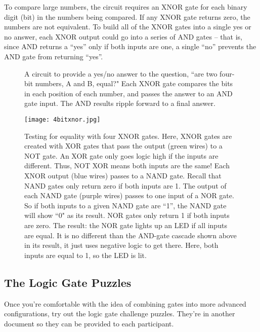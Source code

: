 To compare large numbers, the circuit requires an XNOR gate for each binary digit (bit) in the numbers being compared. If any XNOR gate returns zero, the numbers are not equivalent. To build all of the XNOR gates into a single yes or no answer, each XNOR output could go into a series of AND gates -- that is, since AND returns a ``yes'' only if both inputs are one, a single ``no'' prevents the AND gate from returning ``yes''. 


\begin{figure}[h!]
\begin{center}

\caption{A circuit to provide a yes/no answer to the question, ``are  two four-bit numbers, A and B, equal?" Each XNOR gate compares the bits in each position of each number, and passes the answer to an AND gate input. The AND results ripple forward to a final answer.}
\end{center}
\end{figure}


\begin{figure}[h!]
\begin{center}
\texttt{[image: 4bitxnor.jpg]}
\caption{Testing for equality with four XNOR gates. Here, XNOR gates are created with XOR gates that pass the output (green wires) to a NOT gate. An XOR gate only goes logic high if the inputs are different. Thus, NOT XOR means both inputs are the same! Each XNOR output (blue wires) passes to a NAND gate. Recall that NAND gates only return zero if both inputs are 1. The output of each NAND gate (purple wires) passes to one input of a NOR gate. So if both inputs to a given NAND gate are ``1'', the NAND gate will show ``0" as its result. NOR gates only return 1 if both inputs are zero. The result: the NOR gate lights up an LED if all inputs are equal. It is no different than the AND-gate cascade shown above in its result, it just uses negative logic to get there. Here, both inputs are equal to 1, so the LED is lit.}
\end{center}
\end{figure}


\subsection*{The Logic Gate Puzzles}

Once you're comfortable with the idea of combining gates into more advanced configurations, try out the logic gate challenge puzzles. They're in another document so they can be provided to each participant.



\clearpage


